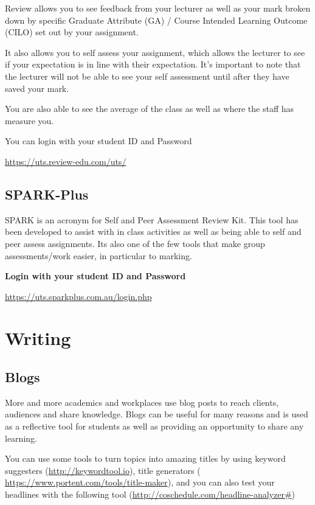 \documentclass[]{book}
\theoremstyle{definition}
\theoremstyle{definition}
\theoremstyle{remark}
\begin{document}
Review allows you to see feedback from your lecturer as well as your
mark broken down by specific Graduate Attribute (GA) / Course Intended
Learning Outcome (CILO) set out by your assignment.

It also allows you to self assess your assignment, which allows the
lecturer to see if your expectation is in line with their expectation.
It's important to note that the lecturer will not be able to see your
self assessment until after they have saved your mark.

You are also able to see the average of the class as well as where the
staff has measure you.

You can login with your student ID and Password

\url{https://uts.review-edu.com/uts/}

\subsection{SPARK-Plus}\label{spark-plus}

SPARK is an acronym for Self and Peer Assessment Review Kit. This tool
has been developed to assist with in class activities as well as being
able to self and peer assess assignments. Its also one of the few tools
that make group assessments/work easier, in particular to marking.

\textbf{Login with your student ID and Password}

\url{https://uts.sparkplus.com.au/login.php}

\section{Writing}\label{writing}

\subsection{Blogs}\label{blogs}

More and more academics and workplaces use blog posts to reach clients,
audiences and share knowledge. Blogs can be useful for many reasons and
is used as a reflective tool for students as well as providing an
opportunity to share any learning.

You can use some tools to turn topics into amazing titles by using
keyword suggesters (\url{http://keywordtool.io}), title generators (
\url{https://www.portent.com/tools/title-maker}), and you can also test
your headlines with the following tool
(\url{http://coschedule.com/headline-analyzer\#})
\end{document}
